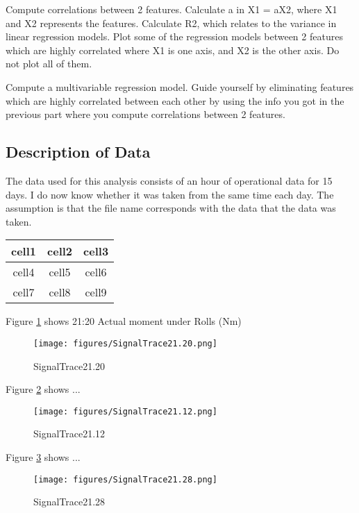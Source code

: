\documentclass{article}
\begin{document}
Compute correlations between 2 features.
Calculate a in X1 = aX2, where X1 and X2 represents the features.
Calculate R2, which relates to the variance in linear regression models.
Plot some of the regression models between 2 features which are highly correlated where X1 is one axis, and X2 is the other axis. Do not plot all of them.

Compute a multivariable regression model.
Guide yourself by eliminating features which are highly correlated between each other by using the info you got in the previous part where you compute correlations between 2 features.

\subsection{Description of Data}
The data used for this analysis consists of an hour of operational data for 15 days. I do now know whether it was taken from the same time each day. The assumption is that the file name corresponds with the data that the data was taken.

\begin{center}
\begin{tabular}{ |c|c|c| }
 \hline
 cell1 & cell2 & cell3 \\ 
 \hline
 cell4 & cell5 & cell6 \\  
 \hline
 cell7 & cell8 & cell9  \\
 \hline
\end{tabular}
\end{center}

Figure \ref{fig:SignalTrace21.20} shows 21:20 Actual moment under Rolls (Nm)

\begin{figure}[!ht]
    \centering
    \texttt{[image: figures/SignalTrace21.20.png]}
    \caption{SignalTrace21.20}
    \label{fig:SignalTrace21.20}
\end{figure}

Figure \ref{fig:SignalTrace21.12} shows ...
\begin{figure}[!ht]
    \centering
    \texttt{[image: figures/SignalTrace21.12.png]}
    \caption{SignalTrace21.12}
    \label{fig:SignalTrace21.12}
\end{figure}

Figure \ref{fig:SignalTrace21.28} shows ...
\begin{figure}[!ht]
    \centering
    \texttt{[image: figures/SignalTrace21.28.png]}
    \caption{SignalTrace21.28}
    \label{fig:SignalTrace21.28}
\end{figure}
\end{document}
